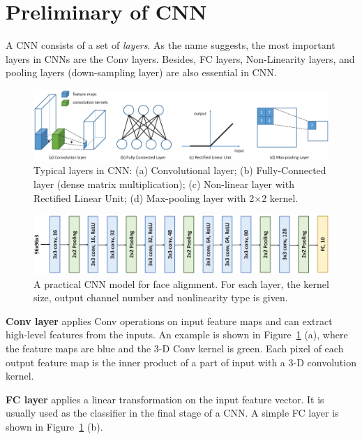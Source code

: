 \documentclass[10pt, conference, compsocconf]{IEEEtran}
\begin{document}
\section{Preliminary of CNN} \label{sec:prime}
A CNN consists of a set of \emph{layers}. As the name suggests, the most important layers in CNNs are the Conv layers. Besides, FC layers, Non-Linearity layers, and pooling layers (down-sampling layer) are also essential in CNN.

\begin{figure}[h]
  \centering
  \includegraphics[width=2\columnwidth]{figure/primer.eps}
  \small
  \caption{Typical layers in CNN: (a) Convolutional layer; (b) Fully-Connected layer (dense matrix multiplication); (c) Non-linear layer with Rectified Linear Unit; (d) Max-pooling layer with 2$\times$2 kernel.}
  \label{fig:primer}
\end{figure}

\begin{figure}[h]
  \centering
  \includegraphics[width=1.8\columnwidth]{figure/alignment_net.eps}
  \small
  \caption{A practical CNN model for face alignment. For each layer, the kernel size, output channel number and nonlinearity type is given.}
  \label{fig:face_align_net}
\end{figure}

\textbf{Conv layer} applies Conv operations on input feature maps and can extract high-level features from the inputs. An example is shown in Figure~\ref{fig:primer} (a), where the feature maps are blue and the 3-D Conv kernel is green. Each pixel of each output feature map is the inner product of a part of input with a 3-D convolution kernel.

\textbf{FC layer} applies a linear transformation on the input feature vector. It is usually used as the classifier in the final stage of a CNN. A simple FC layer is shown in Figure~\ref{fig:primer} (b).
\end{document}
